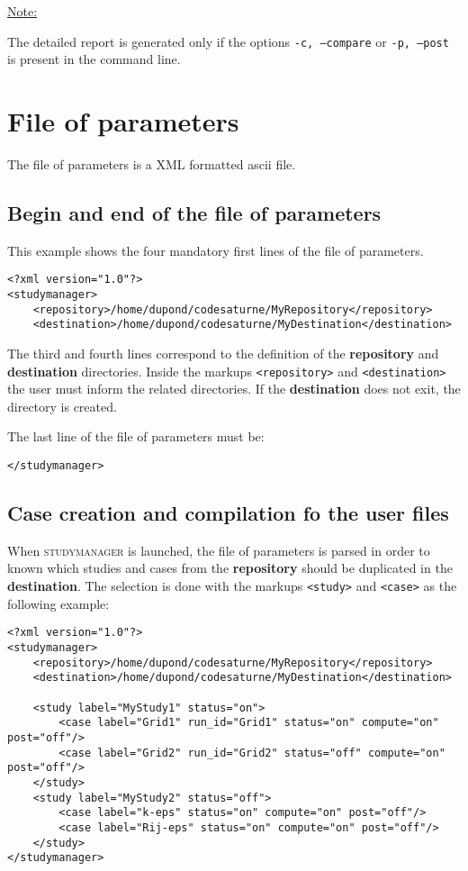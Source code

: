 \documentclass[a4paper,10pt,twoside]{csshortdoc}
\begin{document}
\underline{Note:}

The detailed report is generated only if the options \texttt{-c, --compare}
or \texttt{-p, --post} is present in the command line.

\section{File of parameters}

The file of parameters is a XML formatted ascii file.

\subsection{Begin and end of the file of parameters}

This example shows the four mandatory first lines of the file of parameters.

\small
\begin{verbatim}
<?xml version="1.0"?>
<studymanager>
    <repository>/home/dupond/codesaturne/MyRepository</repository>
    <destination>/home/dupond/codesaturne/MyDestination</destination>
\end{verbatim}
\normalsize

The third and fourth lines correspond to the definition of the
\textbf{repository} and \textbf{destination} directories.
Inside the markups \texttt{<repository>} and \texttt{<destination>} the user
must inform the related directories. If the \textbf{destination} does not exit,
the directory is created.

The last line of the file of parameters must be:

\small
\begin{verbatim}
</studymanager>
\end{verbatim}
\normalsize

\subsection{Case creation and compilation fo the user files}

When \textsc{studymanager} is launched, the file of parameters is parsed in order to
known which studies and cases from the \textbf{repository} should be duplicated
in the \textbf{destination}. The selection is done with the markups
\texttt{<study>} and \texttt{<case>} as the following example:

\small
\begin{verbatim}
<?xml version="1.0"?>
<studymanager>
    <repository>/home/dupond/codesaturne/MyRepository</repository>
    <destination>/home/dupond/codesaturne/MyDestination</destination>

    <study label="MyStudy1" status="on">
        <case label="Grid1" run_id="Grid1" status="on" compute="on" post="off"/>
        <case label="Grid2" run_id="Grid2" status="off" compute="on" post="off"/>
    </study>
    <study label="MyStudy2" status="off">
        <case label="k-eps" status="on" compute="on" post="off"/>
        <case label="Rij-eps" status="on" compute="on" post="off"/>
    </study>
</studymanager>
\end{verbatim}
\normalsize
\end{document}
